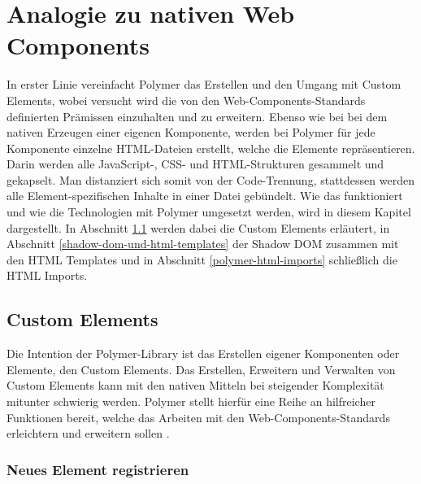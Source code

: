 \chapter{Analogie zu nativen Web Components}\label{analogie-zu-nativen-web-components}

In erster Linie vereinfacht Polymer das Erstellen und den Umgang mit Custom Elements, wobei versucht wird die von den Web-Components-Standards definierten Prämissen einzuhalten und zu erweitern. Ebenso wie bei bei dem nativen Erzeugen einer eigenen Komponente, werden bei Polymer für jede Komponente einzelne \ac{HTML}-Dateien erstellt, welche die Elemente repräsentieren. Darin werden alle JavaScript-, \ac{CSS}- und \ac{HTML}-Strukturen gesammelt und gekapselt. Man distanziert sich somit von der Code-Trennung, stattdessen werden alle Element-spezifischen Inhalte in einer Datei gebündelt. Wie das funktioniert und wie die Technologien mit Polymer umgesetzt werden, wird in diesem Kapitel dargestellt. In Abschnitt \ref{polymer-custom-elements} werden dabei die Custom Elements erläutert, in Abschnitt \ref{shadow-dom-und-html-templates} der Shadow \ac{DOM} zusammen mit den \ac{HTML} Templates und in Abschnitt \ref{polymer-html-imports} schließlich die \ac{HTML} Imports.


\section{Custom Elements}\label{polymer-custom-elements}

Die Intention der Polymer-Library ist das Erstellen eigener Komponenten oder Elemente, den Custom Elements. Das Erstellen, Erweitern und Verwalten von Custom Elements kann mit den nativen Mitteln bei steigender Komplexität mitunter schwierig werden. Polymer stellt hierfür eine Reihe an hilfreicher Funktionen bereit, welche das Arbeiten mit den Web-Components-Standards erleichtern und erweitern sollen \cite{citeulike:13915080}.


\subsection{Neues Element registrieren}\label{neues-element-registrieren}

